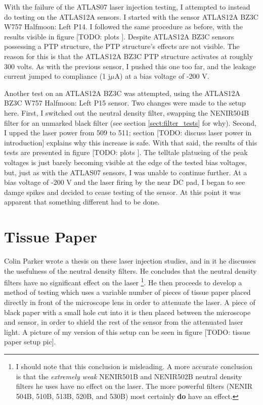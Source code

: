 \documentclass{report}
\begin{document}
            With the failure of the ATLAS07 laser injection testing, I attempted to instead do testing on the ATLAS12A sensors. I started with the sensor ATLAS12A BZ3C W757 Halfmoon: Left P14. I followed the same procedure as before, with the results visible in figure [TODO: plots
            ]. Despite ATLAS12A BZ3C sensors possessing a PTP structure, the PTP structure's effects are not visible. The reason for this is that the ATLAS12A BZ3C PTP structure activates at roughly 300 volts. As with the previous sensor, I pushed this one too far, and the leakage current jumped to compliance (1 j$\mu$A) at a bias voltage of -200 V.

            Another test on an ATLAS12A BZ3C was attempted, using the ATLAS12A BZ3C W757 Halfmoon: Left P15 sensor. Two changes were made to the setup here. First, I switched out the neutral density filter, swapping the NENIR504B filter for an unmarked \label{page:504_to_black_filter} black filter (see section \ref{sect:filter_tests} for why). Second, I upped the laser power from 509 to 511; section [TODO: discuss laser power in introduction] explains why this increase is safe. With that said, the results of this tests are presented in figure [TODO: plots
            ]. The telltale platueing of the peak voltages is just barely becoming visible at the edge of the tested bias voltages, but, just as with the ATLAS07 sensors, I was unable to continue further. At a bias voltage of -200 V and the laser firing by the near DC pad, I began to see damge spikes and decided to cease testing of the sensor. At this point it was apparent that something different had to be done.
            

        \section{Tissue Paper}
            Colin Parker wrote a thesis on these laser injection studies, and in it he discusses the usefulness of the neutral density filters. He concludes that the neutral density filters have no significant effect on the laser \footnote{I should note that this conclusion is misleading. A more accurate conclusion is that the \textit{extremely weak} NENIR501B and NENIR502B neutral density filters he uses have no effect on the laser. The more powerful filters (NENIR 504B, 510B, 513B, 520B, and 530B) most certainly \textbf{do} have an effect.}. He then proceeds to develop a method of testing which uses a variable number of pieces of tissue paper placed directly in front of the microscope lens in order to attenuate the laser. A piece of black paper with a small hole cut into it is then placed between the microscope and sensor, in order to shield the rest of the sensor from the attenuated laser light. A picture of my version of this setup can be seen in figure [TODO: tissue paper setup pic].
\end{document}
